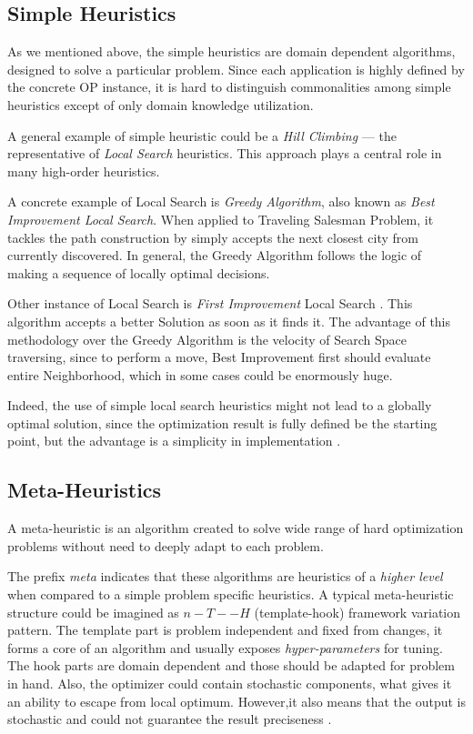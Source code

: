 \subsection{Simple Heuristics}
As we mentioned above, the simple heuristics are domain dependent algorithms, designed to solve a particular problem.
Since each application is highly defined by the concrete OP instance, it is hard to distinguish commonalities among simple heuristics except of only domain knowledge utilization.

A general example of simple heuristic could be a \textit{Hill Climbing} — the representative of \textit{Local Search} heuristics. This approach plays a central role in many high-order heuristics.

A concrete example of Local Search is \textit{Greedy Algorithm}, also known as \textit{Best Improvement Local Search}. When applied to Traveling Salesman Problem, it tackles the path construction by simply accepts the next closest city from currently discovered. In general, the Greedy Algorithm follows the logic of making a sequence of locally optimal decisions. 


Other instance of Local Search is \textit{First Improvement} Local Search \cite{voudouris1999guided}. This algorithm accepts a better Solution as soon as it finds it. The advantage of this methodology over the Greedy Algorithm is the velocity of Search Space traversing, since to perform a move, Best Improvement first should evaluate entire Neighborhood, which in some cases could be enormously huge.

Indeed, the use of simple local search heuristics might not lead to a globally optimal solution, since the optimization result is fully defined be the starting point, but the advantage is a simplicity in implementation \cite{williamson2011design}.



\subsection{Meta-Heuristics}
A meta-heuristic is an algorithm created to solve wide range of hard optimization problems without need to deeply adapt to each problem. 


The prefix \textit{meta} indicates that these algorithms are heuristics of a \textit{higher level} when compared to a simple problem specific heuristics. A typical meta-heuristic structure could be imagined as $n-T--H$ (template-hook) framework variation pattern. The template part is problem independent and fixed from changes, it forms a core of an algorithm and usually exposes \textit{hyper-parameters} for tuning. The hook parts are domain dependent and those should be adapted for problem in hand.
Also, the optimizer could contain stochastic components, what gives it an ability to escape from local optimum. However,it also means that the output is stochastic and could not guarantee the result preciseness \cite{boussaid2013survey}.


